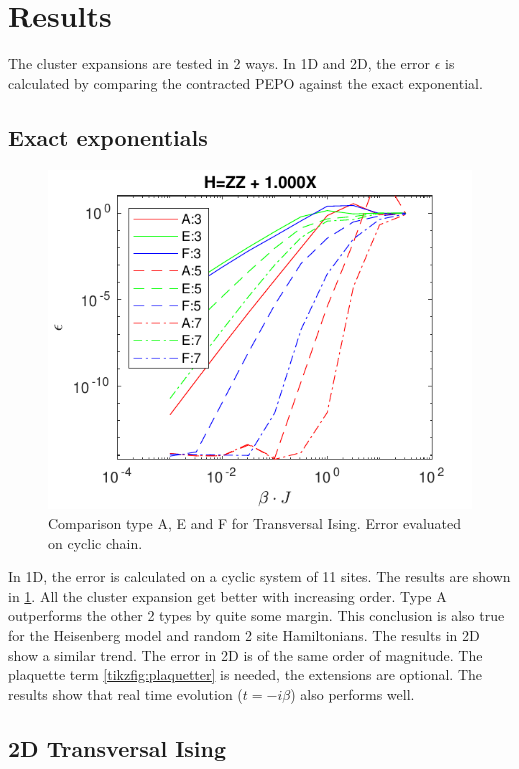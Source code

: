 \documentclass[twocolumn]{article}
\newcounter{a}
\newcounter{b}
\begin{document}
\section{Results}
The cluster expansions are tested in 2 ways. In 1D and 2D, the error $\epsilon$ is calculated by comparing the contracted PEPO against the exact exponential.

\subsection{Exact exponentials}
\begin{figure}[h!]
    \center
    \includegraphics[width=\linewidth]{../Figuren/benchmarking/t_ising_small.pdf}
    \caption{Comparison type A, E and F for Transversal Ising. Error evaluated on cyclic chain. }
    \label{fig:benchmark:tising}
\end{figure}

In 1D, the error is calculated on a cyclic system of 11 sites. The results are shown in \cref{fig:benchmark:tising}. All the cluster expansion get better with increasing order. Type A outperforms the other 2 types by quite some margin. This conclusion is also true for the Heisenberg model and random 2 site Hamiltonians. The results in 2D show a similar trend. The error in 2D is of the same order of magnitude. The plaquette term \cref{tikzfig:plaquetter} is needed, the extensions are optional. The results show that real time evolution ($t = - i \beta$) also performs well.

\subsection{2D Transversal Ising}
\end{document}
